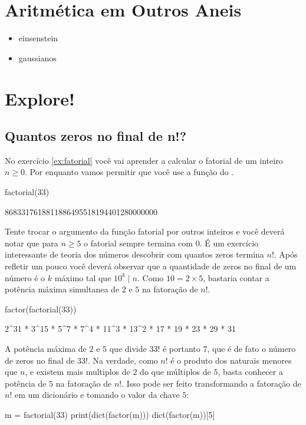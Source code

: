 \section{Aritmética em Outros Aneis}
\begin{itemize}
  \item einsenstein
  \item gaussianos
\end{itemize}



\section{Explore!}
\label{sec1:explore}
\subsection{Quantos zeros no final de n!?}
\label{par:zerofat}
No exercício \ref{ex:fatorial} você vai aprender a calcular 
o fatorial de um inteiro $n\geq 0$. Por enquanto
vamos permitir que você use a função 
do \Sage.
\begin{sageinput}
factorial(33)
\end{sageinput}
\begin{sageoutput}
8683317618811886495518194401280000000
\end{sageoutput}
Tente trocar o argumento da função fatorial por
outros inteiros e você deverá notar que
para $n\geq 5$ o fatorial sempre termina com $0$. É um
exercício interessante de teoria dos números descobrir
com quantos zeros termina $n!$. Após refletir um pouco
você deverá observar que a quantidade de zeros
no final de um número é o $k$ máximo tal que
$10^k \mid n$. Como $10 = 2\times 5$, bastaria contar
a potência máxima simultanea de $2$ e $5$ na fatoração
de $n!$. 
\begin{sageinput}
factor(factorial(33))
\end{sageinput}
\begin{sageoutput}
2^31 * 3^15 * 5^7 * 7^4 * 11^3 * 13^2 * 17 * 19 * 23 * 29 * 31
\end{sageoutput}
A potência máxima de $2$ e $5$ que divide $33!$ é
portanto $7$, que é de fato o número de zeros no
final de $33!$.
Na verdade, como $n!$ é o produto dos
naturais menores que $n$, e existem mais
multiplos de $2$ do que múltiplos de $5$,
basta conhecer a potência de $5$ na
fatoração de $n!$. Isso pode ser feito transformando
a fatoração de $n!$ em um dicionário e tomando
o valor da chave $5$:
\begin{sageinput}
m = factorial(33)
print(dict(factor(m)))
dict(factor(m))[5]
\end{sageinput}

